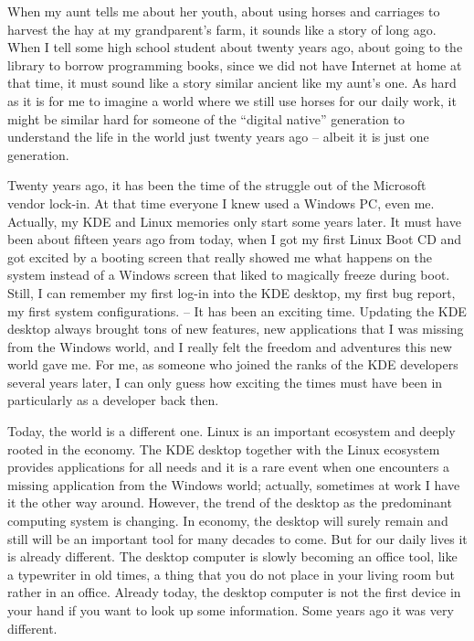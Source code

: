 
\noindent{}When my aunt tells me about her youth, about using horses and carriages to harvest the hay at my grandparent’s farm, it sounds like a story of long ago. When I tell some high school student about twenty years ago, about going to the library to borrow programming books, since we did not have Internet at home at that time, it must sound like a story similar ancient like my aunt’s one. As hard as it is for me to imagine a world where we still use horses for our daily work, it might be similar hard for someone of the ``digital native'' generation to understand the life in the world just twenty years ago – albeit it is just one generation.

Twenty years ago, it has been the time of the struggle out of the Microsoft vendor lock-in. At that time everyone I knew used a Windows PC, even me. Actually, my KDE and Linux memories only start some years later. It must have been about fifteen years ago from today, when I got my first Linux Boot CD and got excited by a booting screen that really showed me what happens on the system instead of a Windows screen that liked to magically freeze during boot. Still, I can remember my first log-in into the KDE desktop, my first bug report, my first system configurations. -- It has been an exciting time. Updating the KDE desktop always brought tons of new features, new applications that I was missing from the Windows world, and I really felt the freedom and adventures this new world gave me. For me, as someone who joined the ranks of the KDE developers several years later, I can only guess how exciting the times must have been in particularly as a developer back then.

Today, the world is a different one. Linux is an important ecosystem and deeply rooted in the economy. The KDE desktop together with the Linux ecosystem provides applications for all needs and it is a rare event when one encounters a missing application from the Windows world; actually, sometimes at work I have it the other way around. However, the trend of the desktop as the predominant computing system is changing. In economy, the desktop will surely remain and still will be an important tool for many decades to come. But for our daily lives it is already different. The desktop computer is slowly becoming an office tool, like a typewriter in old times, a thing that you do not place in your living room but rather in an office. Already today, the desktop computer is not the first device in your hand if you want to look up some information. Some years ago it was very different.

